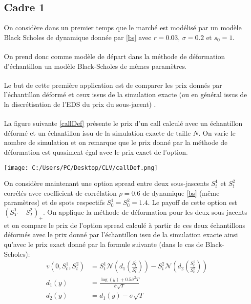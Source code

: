 \documentclass[a4paper,12pt]{report}
\numberwithin{equation}{section}
\theoremstyle{definition}
\numberwithin{equation}{section}
\begin{document}
\subsection{Cadre 1}
On considère dans un premier temps que le marché est modélisé par un modèle Black Scholes de dynamique donnée par \ref{bs} avec $r=0.03$, $\sigma=0.2$ et $s_0 = 1$.\\\\
On prend donc comme modèle de départ dans la méthode de déformation d'échantillon un modèle Black-Scholes de mêmes paramètres.\\\\
Le but de cette première application est de comparer les prix donnés par l'échantillon déformé et ceux issus de la simulation exacte (ou en général issus de la discrétisation de l'EDS du prix du sous-jacent) .\\\\
La figure suivante \ref{callDef} présente le prix d'un call calculé avec un échantillon déformé et un échantillon issu de la simulation exacte de taille $N$. On varie le nombre de simulation et on remarque que le prix donné par la méthode de déformation est quasiment égal avec le prix exact de l'option.
\begin{center}
\label{callDef}
\texttt{[image: C:/Users/PC/Desktop/CLV/callDef.png]}
\end{center}
On considère maintenant une option spread entre deux sous-jascents $S_t^1$ et $S_t^2$ corrélés avec coefficient de corrélation $\rho = 0.6$ de dynamique \ref{bs} (même paramètres) et de spots respectifs $S^1_0 = S^2_0 = 1.4$. Le payoff de cette option est $(S_T^1 - S_T^2)_+$. On applique la méthode de déformation pour les deux sous-jacents et on compare le prix de l'option spread calculé à partir de ces deux échantillons déformés avec le prix donné par l'échantillon issu de la simulation exacte ainsi qu'avec le prix exact donné par la formule suivante (dans le cas de Black-Scholes):
\begin{equation*}
\begin{split}
v(0, S_t^1, S_t^2) &= S_t^1 \mathcal{N}\left(d_1\left(\frac{S_t^1}{S_t^2}\right)\right) - S_t^2 \mathcal{N}\left(d_2\left(\frac{S_t^1}{S_t^2}\right)\right)\\
d_1(y) & = \displaystyle \frac{\log(y) + 0.5  \bar \sigma^2 T}{\bar \sigma \sqrt{T}}\\
d_2(y) &= d_1(y) - \bar \sigma \sqrt{T}
\end{split}
\end{equation*}
\end{document}

